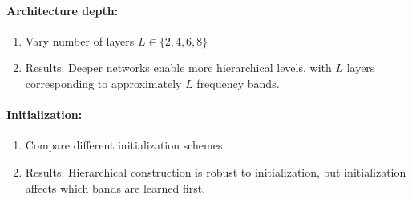 \paragraph{Architecture depth:}
\begin{enumerate}
    \item Vary number of layers $L \in \{2, 4, 6, 8\}$
    \item Results: Deeper networks enable more hierarchical levels, with $L$ layers corresponding to approximately $L$ frequency bands.
\end{enumerate}

\paragraph{Initialization:}
\begin{enumerate}
    \item Compare different initialization schemes
    \item Results: Hierarchical construction is robust to initialization, but initialization affects which bands are learned first.
\end{enumerate}
